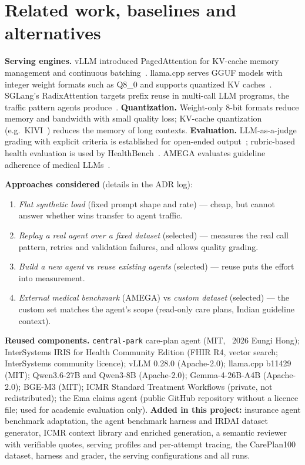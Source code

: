 \documentclass[conference]{IEEEtran}
\begin{document}
\section{Related work, baselines and alternatives}
\textbf{Serving engines.} vLLM introduced PagedAttention for KV-cache memory management and continuous batching~\cite{kwon2023vllm}. llama.cpp serves GGUF models with integer weight formats such as Q8\_0 and supports quantized KV caches~\cite{llamacpp}. SGLang's RadixAttention targets prefix reuse in multi-call LLM programs, the traffic pattern agents produce~\cite{zheng2024sglang}.
\textbf{Quantization.} Weight-only 8-bit formats reduce memory and bandwidth with small quality loss; KV-cache quantization (e.g.\ KIVI~\cite{liu2024kivi}) reduces the memory of long contexts.
\textbf{Evaluation.} LLM-as-a-judge grading with explicit criteria is established for open-ended output~\cite{zheng2023judge}; rubric-based health evaluation is used by HealthBench~\cite{arora2025healthbench}. AMEGA evaluates guideline adherence of medical LLMs~\cite{fast2024amega}.

\textbf{Approaches considered} (details in the ADR log):
\begin{enumerate}
\item \emph{Flat synthetic load} (fixed prompt shape and rate) --- cheap, but cannot answer whether wins transfer to agent traffic.
\item \emph{Replay a real agent over a fixed dataset} (selected) --- measures the real call pattern, retries and validation failures, and allows quality grading.
\item \emph{Build a new agent} vs \emph{reuse existing agents} (selected) --- reuse puts the effort into measurement.
\item \emph{External medical benchmark} (AMEGA) vs \emph{custom dataset} (selected) --- the custom set matches the agent's scope (read-only care plans, Indian guideline context).
\end{enumerate}

\textbf{Reused components.} \texttt{central-park} care-plan agent (MIT, \textcopyright\ 2026 Eungi Hong); InterSystems IRIS for Health Community Edition (FHIR R4, vector search; InterSystems community licence); vLLM 0.28.0 (Apache-2.0); llama.cpp b11429 (MIT); Qwen3.6-27B and Qwen3-8B (Apache-2.0); Gemma-4-26B-A4B (Apache-2.0); BGE-M3 (MIT); ICMR Standard Treatment Workflows (private, not redistributed); the Ema claims agent (public GitHub repository without a licence file; used for academic evaluation only). \textbf{Added in this project:} insurance agent benchmark adaptation, the agent benchmark harness and IRDAI dataset generator, ICMR context library and enriched generation, a semantic reviewer with verifiable quotes, serving profiles and per-attempt tracing, the CarePlan100 dataset, harness and grader, the serving configurations and all runs.
\end{document}
